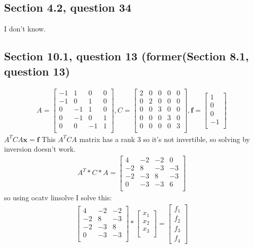 \documentclass[a4paper,11pt]{article}
\newcommand{\mybf}[1]{\boldsymbol{#1}}
\begin{document}
\subsection*{Section 4.2, question 34}
I don't know.
\subsection*{Section 10.1, question 13 (former(Section 8.1, question 13)}
\begin{align*}
A = 
\begin{bmatrix}
-1 & 1  & 0  & 0 \\
-1 & 0  & 1  & 0 \\
0  & -1 & 1  & 0 \\
0  & -1 & 0  & 1 \\
0  & 0  & -1 & 1 \\
\end{bmatrix},
C = 
\begin{bmatrix}
2 & 0  & 0  & 0 & 0 \\
0 & 2  & 0  & 0 & 0 \\
0 & 0  & 3  & 0 & 0 \\
0 & 0  & 0  & 3 & 0 \\
0 & 0  & 0  & 0 & 3 \\
\end{bmatrix},
\mybf{f} = 
\begin{bmatrix}
1  \\
0 \\
0 \\
-1 \\
\end{bmatrix}
\end{align*}
$A^TCA\mybf{x}=\mybf{f}$
This $A^TCA$ matrix has a rank 3 so it's not invertible, so solving by inversion doesn't work.
\begin{align*}
A^T*C*A=
\begin{bmatrix}
4 & -2 & -2 & 0 \\
-2 & 8 & -3 & -3 \\
-2 & -3 & 8 & -3 \\
0 & -3 & -3 & 6 \\
\end{bmatrix}
\end{align*}
so using ocatv linsolve I solve this:
\begin{align*}
\begin{bmatrix}
4 & -2 & -2  \\
-2 & 8 & -3 \\
-2 & -3 & 8 \\
0 & -3 & -3 \\
\end{bmatrix} 
* 
\begin{bmatrix}
x_1  \\
x_2 \\
x_3 \\
\end{bmatrix} 
=
\begin{bmatrix}
f_1  \\
f_2 \\
f_3 \\
f_4
\end{bmatrix} 
\end{align*}
\end{document}
